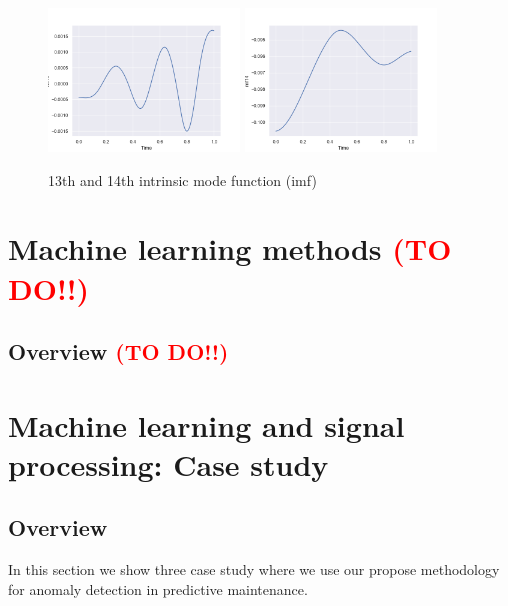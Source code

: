 \documentclass[11pt, oneside]{article}   	%
\begin{document}
\begin{flushleft}
\begin{figure}[H] %
   \centering
   \includegraphics[width=2in]{imf/imf13.png} 
     \includegraphics[width=2in]{imf/imf14.png} 
   \caption{13th and 14th intrinsic mode function (imf)}
   \label{fig:imf1314}
\end{figure}

\end{flushleft}


\section{Machine learning methods   \textcolor{red}{(TO DO!!)}}
\subsection{Overview   \textcolor{red}{(TO DO!!)}}




\section{Machine learning and signal processing: Case study}
\subsection{Overview}
In this section we show three case study where we use our propose methodology for anomaly detection in predictive maintenance.
\end{document}
